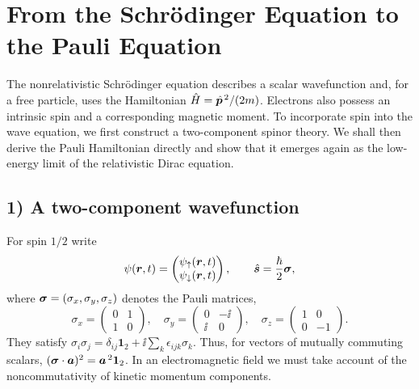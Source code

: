 \section{From the Schr\"odinger Equation to the Pauli Equation}

The nonrelativistic Schr\"odinger equation describes a scalar wavefunction and, for a free particle, uses the Hamiltonian $\hat{H}=\hat{\bm{p}}^{\,2}/(2m)$. Electrons also possess an intrinsic spin and a corresponding magnetic moment. To incorporate spin into the wave equation, we first construct a two-component spinor theory. We shall then derive the Pauli Hamiltonian directly and show that it emerges again as the low-energy limit of the relativistic Dirac equation.

\subsection*{1) A two-component wavefunction}
For spin $1/2$ write
\begin{equation}
 \psi(\bm{r},t)=\begin{pmatrix}\psi_\uparrow(\bm{r},t)\\\psi_\downarrow(\bm{r},t)\end{pmatrix},
 \qquad \hat{\bm{s}}=\frac{\hbar}{2}\bm{\sigma},
\end{equation}
where $\bm{\sigma}=(\sigma_x,\sigma_y,\sigma_z)$ denotes the Pauli matrices,
\begin{equation}
\sigma_x=\begin{pmatrix}0&1\\1&0\end{pmatrix},\quad
\sigma_y=\begin{pmatrix}0&-\ii\\\ii&0\end{pmatrix},\quad
\sigma_z=\begin{pmatrix}1&0\\0&-1\end{pmatrix}.
\end{equation}
They satisfy $\sigma_i\sigma_j=\delta_{ij}\mathbf1_2+\ii\sum_k\epsilon_{ijk}\sigma_k$. Thus, for vectors of mutually commuting scalars, $(\bm{\sigma}\cdot\bm{a})^2=\bm{a}^{\,2}\mathbf1_2$. In an electromagnetic field we must take account of the noncommutativity of kinetic momentum components.

